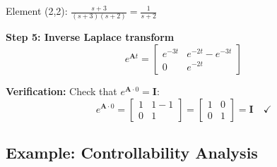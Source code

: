 \begin{example}
Element (2,2): $\frac{s+3}{(s+3)(s+2)} = \frac{1}{s+2}$

\textbf{Step 5: Inverse Laplace transform}
\begin{equation}
e^{\mathbf{A}t} = \begin{bmatrix} e^{-3t} & e^{-2t} - e^{-3t} \\ 0 & e^{-2t} \end{bmatrix}
\end{equation}

\textbf{Verification:} Check that $e^{\mathbf{A} \cdot 0} = \mathbf{I}$:
\begin{equation}
e^{\mathbf{A} \cdot 0} = \begin{bmatrix} 1 & 1-1 \\ 0 & 1 \end{bmatrix} = \begin{bmatrix} 1 & 0 \\ 0 & 1 \end{bmatrix} = \mathbf{I} \quad \checkmark
\end{equation}
\end{example}

\subsection{Example: Controllability Analysis}

